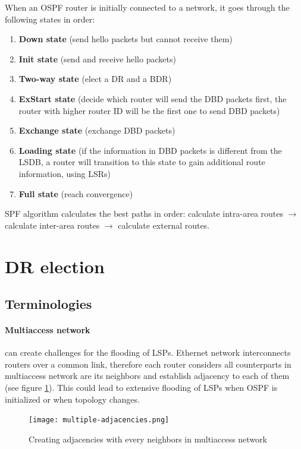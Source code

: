 When an OSPF router is initially connected to a network, it goes through the following states in order:
\begin{enumerate}
\item \textbf{Down state} (send hello packets but cannot receive them)
\item \textbf{Init state} (send and receive hello packets)
\item \textbf{Two-way state} (elect a DR and a BDR)
\item \textbf{ExStart state} (decide which router will send the DBD packets first, the router with higher router ID will be the first one to send DBD packets)%
\item \textbf{Exchange state} (exchange DBD packets)
\item \textbf{Loading state} (if the information in DBD packets is different from the LSDB, a router will transition to this state to gain additional route information, using LSRs)
\item \textbf{Full state} (reach convergence)
\end{enumerate}

SPF algorithm calculates the best paths in order: calculate intra-area routes $\rightarrow$ calculate inter-area routes $\rightarrow$ calculate external routes.

\section{DR election}

\subsection{Terminologies}

\paragraph{Multiaccess network} can create challenges for the flooding of LSPs. Ethernet network interconnects routers over a common link, therefore each router considers all counterparts in multiaccess network are its neighbors and establish adjacency to each of them (see figure \ref{multiple-adjacencies}). This could lead to extensive flooding of LSPs when OSPF is initialized or when topology changes.

\begin{figure}[hbtp]
\centering
\texttt{[image: multiple-adjacencies.png]} 
\caption{Creating adjacencies with every neighbors in multiaccess network}
\label{multiple-adjacencies}
\end{figure}
	
